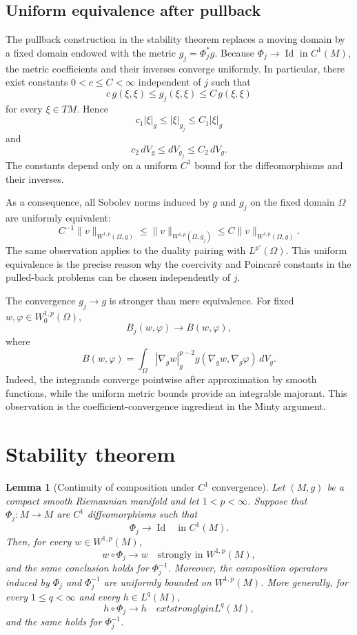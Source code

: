 \documentclass{article}
\newtheorem{lemma}[theorem]{Lemma}
\begin{document}
\subsection{Uniform equivalence after pullback}

The pullback construction in the stability theorem replaces a moving
domain by a fixed domain endowed with the metric $g_j=\Phi_j^*g$.
Because $\Phi_j\to\operatorname{Id}$ in $C^1(M)$, the metric coefficients
and their inverses converge uniformly. In particular, there exist
constants $0<c\le C<\infty$ independent of $j$ such that
\[
c\,g(\xi,\xi)
\leq g_j(\xi,\xi)
\leq C\,g(\xi,\xi)
\]
for every $\xi\in TM$. Hence
\[
c_1|\xi|_g\leq|\xi|_{g_j}\leq C_1|\xi|_g
\]
and
\[
c_2\,dV_g\leq dV_{g_j}\leq C_2\,dV_g.
\]
The constants depend only on a uniform $C^1$ bound for the
diffeomorphisms and their inverses.

As a consequence, all Sobolev norms induced by $g$ and $g_j$ on the fixed
domain $\Omega$ are uniformly equivalent:
\[
C^{-1}\|v\|_{W^{1,p}(\Omega,g)}
\leq
\|v\|_{W^{1,p}(\Omega,g_j)}
\leq
C\|v\|_{W^{1,p}(\Omega,g)}.
\]
The same observation applies to the duality pairing with
$L^{p'}(\Omega)$. This uniform equivalence is the precise reason why the
coercivity and Poincar\'e constants in the pulled-back problems can be
chosen independently of $j$.

The convergence $g_j\to g$ is stronger than mere equivalence. For fixed
$w,\varphi\in W_0^{1,p}(\Omega)$,
\[
B_j(w,\varphi)\longrightarrow B(w,\varphi),
\]
where
\[
B(w,\varphi)
=
\int_\Omega
|\nabla_gw|_g^{p-2}
g(\nabla_gw,\nabla_g\varphi)\,dV_g.
\]
Indeed, the integrands converge pointwise after approximation by smooth
functions, while the uniform metric bounds provide an integrable
majorant. This observation is the coefficient-convergence ingredient in
the Minty argument.

\section{Stability theorem}

\begin{lemma}[Continuity of composition under $C^1$ convergence]
\label{lem:composition-C1-W1p}
Let $(M,g)$ be a compact smooth Riemannian manifold and let $1<p<\infty$. Suppose that $\Phi_j:M\to M$ are $C^1$ diffeomorphisms such that
\[
\Phi_j\to\operatorname{Id}\quad\text{in }C^1(M).
\]
Then, for every $w\in W^{1,p}(M)$,
\[
w\circ\Phi_j\to w\quad\text{strongly in }W^{1,p}(M),
\]
and the same conclusion holds for $\Phi_j^{-1}$. Moreover, the composition
operators induced by $\Phi_j$ and $\Phi_j^{-1}$ are uniformly bounded on
$W^{1,p}(M)$. More generally, for every $1\le q<\infty$ and every
$h\in L^q(M)$,
\[
h\circ\Phi_j\to h\quad	ext{strongly in }L^q(M),
\]
and the same holds for $\Phi_j^{-1}$.
\end{lemma}
\end{document}
